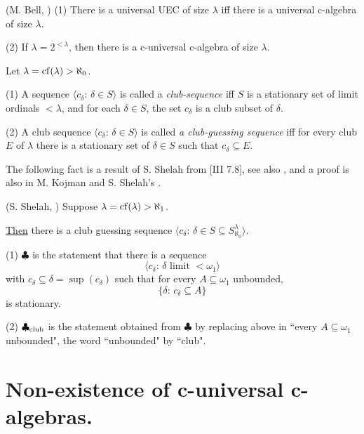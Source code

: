 \begin{Fact}\label{Bell1} (M. Bell, \cite{Bell}) (1) There is a universal UEC
of size $\lambda$ iff there is a universal c-algebra of size $\lambda$.

{\noindent (2)} If $\lambda=2^{<\lambda}$, then there is a c-universal
c-algebra of size $\lambda$.
\end{Fact}

\begin{Definition} Let $\lambda={\rm cf}(\lambda)>\aleph_0$. 

{\noindent (1)} A sequence $\langle c_\delta:\,\delta\in S\rangle$
is called a {\em club-sequence} iff $S$ is a stationary set of limit ordinals
$<\lambda$, and for each $\delta\in S$, the set $c_\delta$ is a club subset
of $\delta$.

{\noindent (2)} A club sequence $\langle c_\delta:\,\delta\in S\rangle$
is called {\em a club-guessing sequence} iff for every club $E$ of $\lambda$
there is a stationary set of $\delta\in S$ such that $c_\delta
\subseteq E$.
\end{Definition}

The following fact is a result of S. Shelah from \cite{Sh e} [III 7.8], see
also \cite{Sh g}, and a proof is also in M. Kojman and
S. Shelah's \cite{KjSh 409}.

\begin{Fact}\label{guessing} (S. Shelah, \cite{Sh e}) Suppose $\lambda=
{\rm cf}(\lambda)>\aleph_1$.

\underline{Then} there is a club guessing sequence
$\langle c_\delta:\,\delta\in S\subseteq S^\lambda_{\aleph_0}\rangle$.
\end{Fact}

\begin{Definition}(1) $\clubsuit$ is the statement that there is a
sequence
\[
\langle c_\delta:\,\delta\mbox{ limit }<\omega_1\rangle
\]
with
$c_\delta\subseteq\delta=\sup(c_\delta)$ such that for every
$A\subseteq \omega_1$ unbounded,
\[
\{\delta:\,c_\delta\subseteq A\}
\]
is stationary.

{\noindent (2)} $\clubsuit_{{\rm club}}$ is the statement obtained
from $\clubsuit$ by replacing above in
``every
$A\subseteq \omega_1$ unbounded", the word ``unbounded" by ``club".
\end{Definition}


\section{Non-existence of c-universal c-algebras.}

